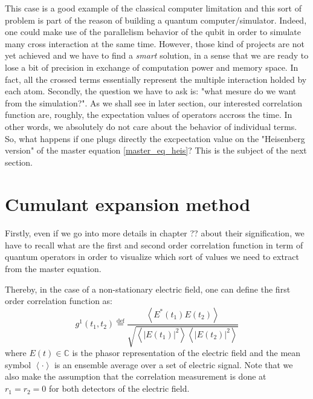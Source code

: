 \documentclass[10pt]{report}
\begin{document}
This case is a good example of the classical computer limitation and this sort of problem is part of the reason of building a quantum computer/simulator. Indeed, one could make use of the parallelism behavior of the qubit in order to simulate many cross interaction at the same time. However, those kind of projects are not yet achieved and we have to find a \textit{smart} solution, in a sense that we are ready to lose a bit of precision in exchange of computation power and memory space. In fact, all the crossed terms essentially represent the multiple interaction holded by each atom. Secondly, the question we have to ask is: "what mesure do we want from the simulation?". As we shall see in later section, our interested correlation function are, roughly, the expectation values of operators accross the time. In other words, we absolutely do not care about the behavior of individual terms. So, what happens if one plugs directly the excpectation value on the "Heisenberg version" of the master equation \eqref{master_eq_heis}? This is the subject of the next section.

\section{Cumulant expansion method}
\paragraph{}

Firstly, even if we go into more details in chapter ?? about their signification, we have to recall what are the first and second order correlation function in term of quantum operators in order to visualize which sort of values we need to extract from the master equation.

Thereby, in the case of a non-stationary electric field, one can define the first order correlation function as:
\begin{equation}
\label{g1_classic_def}
{\displaystyle g ^{1}(t_{1},t_{2})\stackrel{\text{def}}{=}{\frac {\left\langle E^{*}(t_{1})E(t_{2})\right\rangle }{\sqrt{\left\langle \left|E(t_{1})\right|^{2}\right\rangle \left\langle \left|E(t_{2})\right|^{2}\right\rangle }}}}
\end{equation}
where $E(t) \in \mathbb{C}$ is the phasor representation of the electric field and the mean symbol $\left\langle \cdot \right\rangle$ is an ensemble average over a set of electric signal. Note that we also make the assumption that the correlation measurement is done at $r_1 = r_2 = 0$ for both detectors of the electric field.
\end{document}
